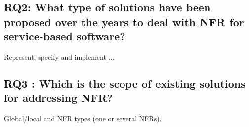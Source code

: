 \subsection{RQ2: What type of solutions have been proposed over the years to deal with NFR for service-based software?}
Represent, specify and implement ...

\subsection{RQ3 : Which is the scope of existing solutions for addressing NFR?}
 Global/local and NFR types (one or several NFRs).
 



